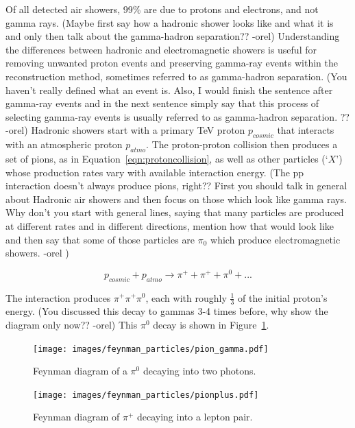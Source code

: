  Of all detected air showers, \nicetilde{}99\% are due to protons and electrons, and not gamma rays.
  {\color{red}(Maybe first say how a hadronic shower looks like and what it is and only then talk about the gamma-hadron separation?? -orel)}
  Understanding the differences between hadronic and electromagnetic showers is useful for removing unwanted proton events and preserving gamma-ray events within the reconstruction method, sometimes referred to as gamma-hadron separation.
  {\color{red}(You haven't really defined what an event is. Also, I would finish the sentence after gamma-ray events and in the next sentence simply say that this process of selecting gamma-ray events is usually referred to as gamma-hadron separation. ?? -orel)}
  Hadronic showers start with a primary \nicetilde TeV proton $p_{cosmic}$ that interacts with an atmospheric proton $p_{atmo}$.
  The proton-proton collision then produces a set of pions, as in Equation~\ref{eqn:protoncollision}, as well as other particles (`$X$') whose production rates vary with available interaction energy.
  {\color{red}(The pp interaction doesn't always produce pions, right?? First you should talk in general about Hadronic air showers and then focus on those which look like gamma rays. Why don't you start with general lines, saying that many particles are produced at different rates and in different directions, mention how that would look like and then say that some of those particles are $\pi_0$ which produce electromagnetic showers. -orel )}
  
  \begin{equation}\label{eqn:protoncollision}
    p_{cosmic} + p_{atmo} \rightarrow \pi^+ + \pi^+ + \pi^0 + ...
  \end{equation}
  
  The interaction produces $\pi^+\pi^+\pi^0$, each with roughly \nicetilde $\frac{1}{3}$ of the initial proton's energy.
  {\color{red}(You discussed this decay to gammas 3-4 times before, why show the diagram only now?? -orel)}
  This $\pi^{0}$ decay is shown in Figure~\ref{fig:feynman_pi0}.
  
  \begin{figure}[ht]
    \centering
    \texttt{[image: images/feynman\_particles/pion\_gamma.pdf]}
    \caption[Feynman Diagram of $\pi^{0}$ Decay]{
      Feynman diagram of a $\pi^{0}$ decaying into two photons.
      \CaptionBlankLine
    }
    \label{fig:feynman_pi0}
  \end{figure}

  \begin{figure}[ht]
    \centering
    \texttt{[image: images/feynman\_particles/pionplus.pdf]}
    \caption[Feynman Diagram of $\pi^{+}$ Decay]{
      Feynman diagram of $\pi^{+}$ decaying into a lepton pair.
      \CaptionBlankLine
    }
    \label{fig:feynman_piplus}
  \end{figure}
  
